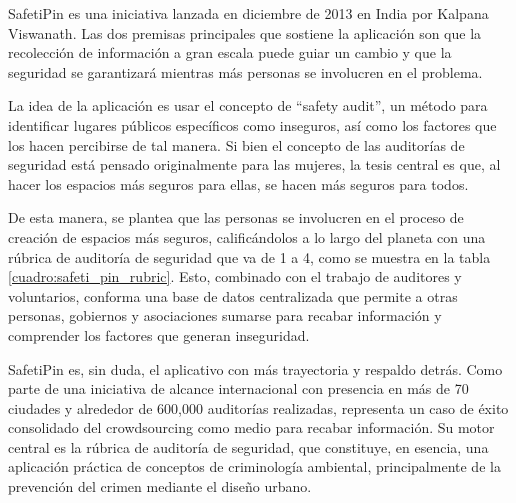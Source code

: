 
SafetiPin es una iniciativa lanzada en diciembre de 2013 en India por Kalpana Viswanath. Las dos premisas principales que sostiene la aplicación son que la recolección de información a gran escala puede guiar un cambio y que la seguridad se garantizará mientras más personas se involucren en el problema\cite{viswanath2015safetipin}.

La idea de la aplicación es usar el concepto de \enquote{safety audit}, un método para identificar lugares públicos específicos como inseguros, así como los factores que los hacen percibirse de tal manera\cite{whitzman2014partnerships}. Si bien el concepto de las auditorías de seguridad está pensado originalmente para las mujeres, la tesis central es que, al hacer los espacios más seguros para ellas, se hacen más seguros para todos\cite{viswanath2015safetipin}.

De esta manera, se plantea que las personas se involucren en el proceso de creación de espacios más seguros, calificándolos a lo largo del planeta con una rúbrica de auditoría de seguridad que va de 1 a 4, como se muestra en la tabla \ref{cuadro:safeti_pin_rubric}. Esto, combinado con el trabajo de auditores y voluntarios, conforma una base de datos centralizada que permite a otras personas, gobiernos y asociaciones sumarse para recabar información y comprender los factores que generan inseguridad.

SafetiPin es, sin duda, el aplicativo con más trayectoria y respaldo detrás. Como parte de una iniciativa de alcance internacional con presencia en más de 70 ciudades y alrededor de 600,000 auditorías realizadas, representa un caso de éxito consolidado del crowdsourcing como medio para recabar información. Su motor central es la rúbrica de auditoría de seguridad, que constituye, en esencia, una aplicación práctica de conceptos de criminología ambiental, principalmente de la prevención del crimen mediante el diseño urbano.

